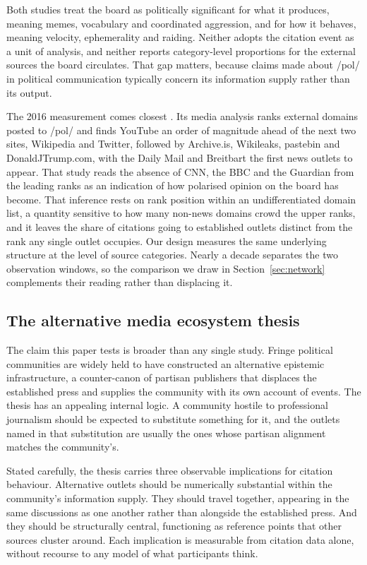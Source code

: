 \documentclass[11pt]{article}
\begin{document}
Both studies treat the board as politically significant for what it produces,
meaning memes, vocabulary and coordinated aggression, and for how it behaves,
meaning velocity, ephemerality and raiding. Neither adopts the citation event as
a unit of analysis, and neither reports category-level proportions for the
external sources the board circulates. That gap matters, because claims made
about /pol/ in political communication typically concern its information supply
rather than its output.

The 2016 measurement comes closest \citep{hine2017}. Its media analysis ranks
external domains posted to /pol/ and finds YouTube an order of magnitude ahead
of the next two sites, Wikipedia and Twitter, followed by Archive.is, Wikileaks,
pastebin and DonaldJTrump.com, with the Daily Mail and Breitbart the first news
outlets to appear. That study reads the absence of CNN, the BBC and the Guardian
from the leading ranks as an indication of how polarised opinion on the board
has become. That
inference rests on rank position within an undifferentiated domain list, a
quantity sensitive to how many non-news domains crowd the upper ranks, and it
leaves the share of citations going to established outlets distinct from the
rank any single outlet occupies. Our design measures the same underlying
structure at the level of source categories. Nearly a decade separates the two
observation windows, so the comparison we draw in Section~\ref{sec:network}
complements their reading rather than displacing it.

\subsection{The alternative media ecosystem thesis}

The claim this paper tests is broader than any single study. Fringe political
communities are widely held to have constructed an alternative epistemic
infrastructure, a counter-canon of partisan publishers that displaces the
established press and supplies the community with its own account of events.
The thesis has an appealing internal logic. A community hostile to professional
journalism should be expected to substitute something for it, and the outlets
named in that substitution are usually the ones whose partisan alignment matches
the community's.

Stated carefully, the thesis carries three observable implications for citation
behaviour. Alternative outlets should be numerically substantial within the
community's information supply. They should travel together, appearing in the
same discussions as one another rather than alongside the established press. And
they should be structurally central, functioning as reference points that other
sources cluster around. Each implication is measurable from citation data alone,
without recourse to any model of what participants think.
\end{document}
